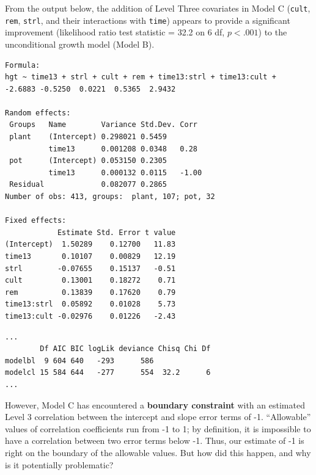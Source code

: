 \documentclass[
]{krantz}
\begin{document}
From the output below, the addition of Level Three covariates in Model C (\texttt{cult}, \texttt{rem}, \texttt{strl}, and their interactions with \texttt{time}) appears to provide a significant improvement (likelihood ratio test statistic = 32.2 on 6 df, \(p<.001\)) to the unconditional growth model (Model B).

\begin{verbatim}
Formula: 
hgt ~ time13 + strl + cult + rem + time13:strl + time13:cult +  
-2.6883 -0.5250  0.0221  0.5365  2.9432 

Random effects:
 Groups   Name        Variance Std.Dev. Corr 
 plant    (Intercept) 0.298021 0.5459        
          time13      0.001208 0.0348   0.28 
 pot      (Intercept) 0.053150 0.2305        
          time13      0.000132 0.0115   -1.00
 Residual             0.082077 0.2865        
Number of obs: 413, groups:  plant, 107; pot, 32

Fixed effects:
            Estimate Std. Error t value
(Intercept)  1.50289    0.12700   11.83
time13       0.10107    0.00829   12.19
strl        -0.07655    0.15137   -0.51
cult         0.13001    0.18272    0.71
rem          0.13839    0.17620    0.79
time13:strl  0.05892    0.01028    5.73
time13:cult -0.02976    0.01226   -2.43
\end{verbatim}

\begin{verbatim}
...
        Df AIC BIC logLik deviance Chisq Chi Df
modelbl  9 604 640   -293      586             
modelcl 15 584 644   -277      554  32.2      6
...
\end{verbatim}

However, Model C has encountered a \textbf{boundary constraint} with an estimated Level 3 correlation between the intercept and slope error terms of -1. ``Allowable'' values of correlation coefficients run from -1 to 1; by definition, it is impossible to have a correlation between two error terms below -1. Thus, our estimate of -1 is right on the boundary of the allowable values. But how did this happen, and why is it potentially problematic?
\end{document}
